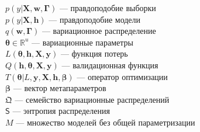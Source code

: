 $p(y|\mathbf{X}, \mathbf{w}, \boldsymbol{\Gamma})$ --- правдоподобие выборки\\
$p(y|\mathbf{X}, \mathbf{h})$ --- правдоподобие модели\\
$q(\mathbf{w}, \boldsymbol{\Gamma})$ --- вариационное распределение\\
$\boldsymbol{\theta} \in \mathbb{R}^u$ --- вариационные параметры\\
$L(\boldsymbol{\theta}, \mathbf{h}, \mathbf{X}, \mathbf{y})$ --- функция потерь\\
$Q(\mathbf{h}, \boldsymbol{\theta},  \mathbf{X}, \mathbf{y})$ --- валидационная функция\\
$T(\boldsymbol{\theta}| L, \mathbf{y}, \mathbf{X},  \mathbf{h}, \boldsymbol{\beta})$ --- оператор оптимизации\\
$\boldsymbol{\beta}$ --- вектор метапараметров\\
$\mathfrak{Q}$ --- семейство вариационные распределений\\
$\mathsf{S}$ --- энтропия распределения\\
$M$ --- множество моделей без общей параметризации\\
